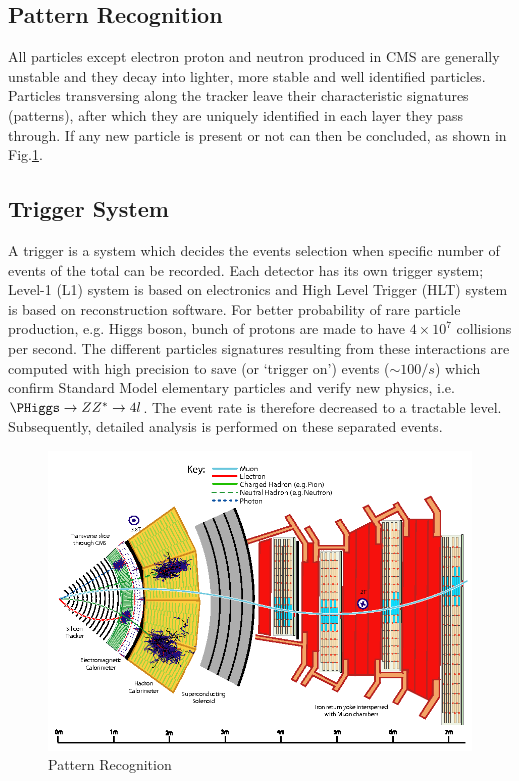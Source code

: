 \subsection{Pattern Recognition}
All particles except electron proton and neutron produced in CMS are generally unstable and they decay into lighter, more stable and well identified particles. Particles transversing along the tracker leave their characteristic signatures (patterns), after which they are uniquely identified in each layer they pass through. If any new particle is present or not can then be concluded, as shown in Fig.\ref{fig:patt}.\\
\subsection{Trigger System}
A trigger is a system which decides the events selection when specific number of events of the total can be recorded. Each detector has its own trigger system; Level-1 (L1) system is based on electronics and High Level Trigger (HLT) system is based on reconstruction software. For better probability of rare particle production, e.g. Higgs boson, bunch of protons are made to have $4 \times 10^{7}$ collisions per second. The different particles signatures resulting from these interactions are computed with high precision to save (or ‘trigger on’) events ($\sim 100/s$) which confirm Standard Model elementary particles and verify new physics, i.e. $\PHiggs \rightarrow ZZ^{*} \rightarrow 4l$. The event rate is therefore decreased to a tractable level. Subsequently, detailed analysis is performed on these separated events.\\
\begin{figure}[h]
\centering
\includegraphics[scale=0.4]{images/pattern.png}
\caption{Pattern Recognition}
\label{fig:patt}
\end{figure}
